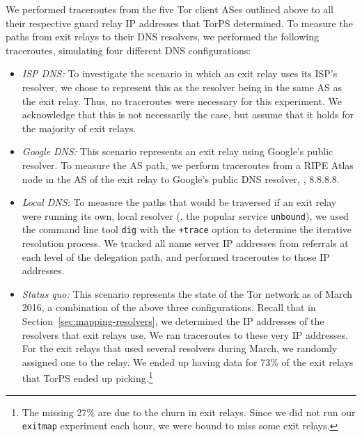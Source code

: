 We performed traceroutes from the five Tor client ASes outlined above to all
their respective guard relay IP addresses that TorPS determined.  To measure the
paths from exit relays to their DNS resolvers, we performed the following
traceroutes, simulating four different DNS configurations:
\begin{itemize}
	\item \emph{ISP DNS:} To investigate the scenario in which an exit relay
		uses its ISP's resolver, we chose to represent this as the resolver
		being in the same AS as the exit relay.  Thus, no traceroutes were
		necessary for this experiment.  We acknowledge that this is not
		necessarily the case, but assume that it holds for the majority of exit
		relays.

	\item \emph{Google DNS:} This scenario represents an exit relay using
		Google's public resolver.  To measure the AS path, we perform
		traceroutes from a RIPE Atlas node in the AS of the exit relay to
		Google's public DNS resolver, \ie, 8.8.8.8.

	\item \emph{Local DNS:} To measure the paths that would be traversed if an
		exit relay were running its own, local resolver (\eg, the popular
		service {\tt unbound}), we used the command line tool {\tt dig} with the
		{\tt +trace} option to determine the iterative resolution process.  We
		tracked all name server IP addresses from referrals at each level of the
		delegation path, and performed traceroutes to those IP addresses.

	\item \emph{Status quo:} This scenario represents the state of the Tor
		network as of March 2016, a combination of the above three configurations.
		Recall that in Section~\ref{sec:mapping-resolvers}, we determined
		the IP addresses of the resolvers that exit relays use.  We ran
		traceroutes to these very IP addresses.  For the exit relays that used
		several resolvers during March, we randomly assigned one to the relay.
		We ended up having data for 73\% of the exit relays that TorPS ended up
		picking.\footnote{The missing 27\% are due to the churn in exit relays.
		Since we did not run our {\tt exitmap} experiment each hour, we were
		bound to miss some exit relays.}
\end{itemize}

